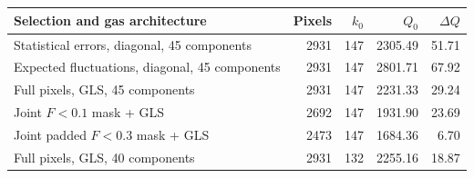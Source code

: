 \begin{tabular}{lrrrr}
\toprule
Selection and gas architecture & Pixels & $k_0$ & $Q_0$ & $\Delta Q$ \\
\midrule
Statistical errors, diagonal, 45 components & 2931 & 147 & 2305.49 & 51.71 \\
Expected fluctuations, diagonal, 45 components & 2931 & 147 & 2801.71 & 67.92 \\
Full pixels, GLS, 45 components & 2931 & 147 & 2231.33 & 29.24 \\
Joint $F<0.1$ mask + GLS & 2692 & 147 & 1931.90 & 23.69 \\
Joint padded $F<0.3$ mask + GLS & 2473 & 147 & 1684.36 & 6.70 \\
Full pixels, GLS, 40 components & 2931 & 132 & 2255.16 & 18.87 \\
\bottomrule
\end{tabular}
